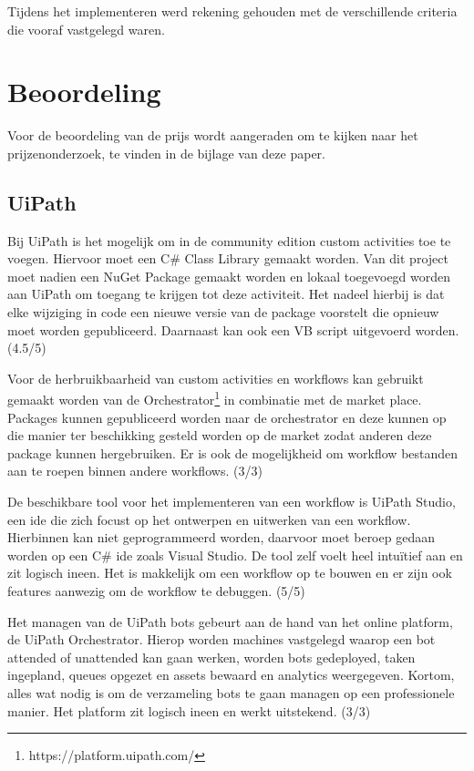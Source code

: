 Tijdens het implementeren werd rekening gehouden met de verschillende criteria die vooraf vastgelegd waren.

\section{Beoordeling}
Voor de beoordeling van de prijs wordt aangeraden om te kijken naar het prijzenonderzoek, te vinden in de bijlage van deze paper.

\subsection{UiPath}
Bij UiPath is het mogelijk om in de community edition custom activities toe te voegen. Hiervoor moet een C\# Class Library gemaakt worden. Van dit project moet nadien een NuGet Package gemaakt worden en lokaal toegevoegd worden aan UiPath om toegang te krijgen tot deze \gls{activiteit}. Het nadeel hierbij is dat elke wijziging in code een nieuwe versie van de package voorstelt die opnieuw moet worden gepubliceerd. Daarnaast kan ook een VB script uitgevoerd worden. (4.5/5)

Voor de herbruikbaarheid van custom activities en \gls{workflow}s kan gebruikt gemaakt worden van de Orchestrator\footnote{https://platform.uipath.com/} in combinatie met de market place. Packages kunnen gepubliceerd worden naar de orchestrator en deze kunnen op die manier ter beschikking gesteld worden op de market zodat anderen deze package kunnen hergebruiken. Er is ook de mogelijkheid om \gls{workflow} bestanden aan te roepen binnen andere \gls{workflow}s. (3/3) 

De beschikbare tool voor het implementeren van een \gls{workflow} is UiPath Studio, een \acrfull{ide} die zich focust op het ontwerpen en uitwerken van een \gls{workflow}. Hierbinnen kan niet geprogrammeerd worden, daarvoor moet beroep gedaan worden op een C\# \acrshort{ide} zoals Visual Studio. De tool zelf voelt heel intuïtief aan en zit logisch ineen. Het is makkelijk om een \gls{workflow} op te bouwen en er zijn ook features aanwezig om de \gls{workflow} te debuggen. (5/5)

Het managen van de UiPath bots gebeurt aan de hand van het online platform, de UiPath Orchestrator. Hierop worden machines vastgelegd waarop een bot attended of unattended kan gaan werken, worden bots gedeployed, taken ingepland, queues opgezet en assets bewaard en analytics weergegeven. Kortom, alles wat nodig is om de verzameling bots te gaan managen op een professionele manier. Het platform zit logisch ineen en werkt uitstekend. (3/3)

